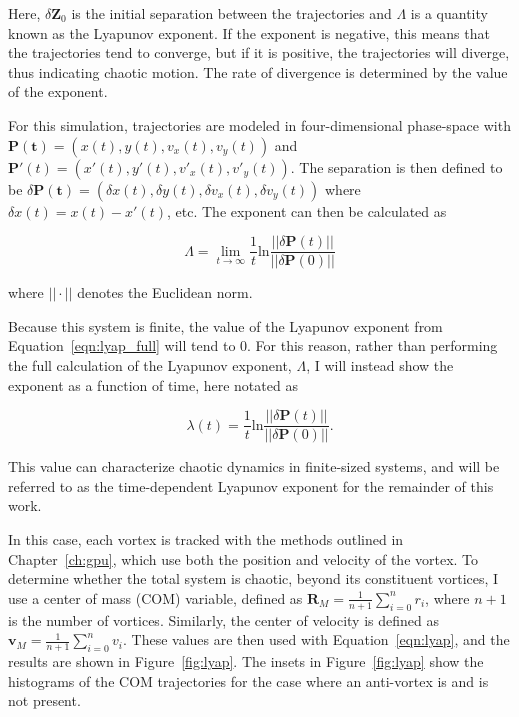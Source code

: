 \noindent Here, $\delta\mathbf{Z}_0$ is the initial separation between the trajectories and $\Lambda$ is a quantity known as the Lyapunov exponent.
If the exponent is negative, this means that the trajectories tend to converge, but if it is positive, the trajectories will diverge, thus indicating chaotic motion.
The rate of divergence is determined by the value of the exponent.

For this simulation, trajectories are modeled in four-dimensional phase-space with $\mathbf{P(t)} = (x(t), y(t), v_x(t), v_y(t))$ and $\mathbf{P}'(t) = (x'(t), y'(t), v'_x(t), v'_y(t))$.
The separation is then defined to be $\delta \mathbf{P(t)} = (\delta x(t), \delta y(t), \delta v_x(t), \delta v_y(t))$ where $\delta x(t) = x(t) - x'(t)$, etc.
The exponent can then be calculated as

\begin{equation}
\Lambda = \lim_{t\to\infty}\frac{1}{t}\text{ln}\frac{||\delta\textbf{P}(t)||}{||\delta\textbf{P}(0)||}
\label{eqn:lyap_full}
\end{equation}

\noindent where $||\cdot||$ denotes the Euclidean norm.

Because this system is finite, the value of the Lyapunov exponent from Equation~\eqref{eqn:lyap_full} will tend to 0.
For this reason, rather than performing the full calculation of the Lyapunov exponent, $\Lambda$, I will instead show the exponent as a function of time, here notated as

\begin{equation}
\lambda(t) = \frac{1}{t}\text{ln}\frac{||\delta\textbf{P}(t)||}{||\delta\textbf{P}(0)||}.
\label{eqn:lyap}
\end{equation}

\noindent This value can characterize chaotic dynamics in finite-sized systems, and
will be referred to as the time-dependent Lyapunov exponent for the remainder of this work.

In this case, each vortex is tracked with the methods outlined in Chapter~\ref{ch:gpu}, which use both the position and velocity of the vortex.
To determine whether the total system is chaotic, beyond its constituent vortices, I use a center of mass (COM) variable, defined as $\mathbf{R}_M = \frac{1}{n+1}\sum_{i=0}^nr_i$, where $n+1$ is the number of vortices.
Similarly, the center of velocity is defined as $\mathbf{v}_M = \frac{1}{n+1}\sum_{i=0}^nv_i$.
These values are then used with Equation~\eqref{eqn:lyap}, and the results are shown in Figure~\ref{fig:lyap}.
The insets in Figure~\ref{fig:lyap} show the histograms of the COM trajectories for the case where an anti-vortex is and is not present.

